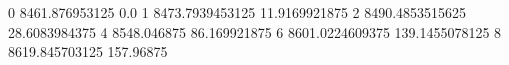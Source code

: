 0 8461.876953125 0.0
1 8473.7939453125 11.9169921875
2 8490.4853515625 28.6083984375
4 8548.046875 86.169921875
6 8601.0224609375 139.1455078125
8 8619.845703125 157.96875
